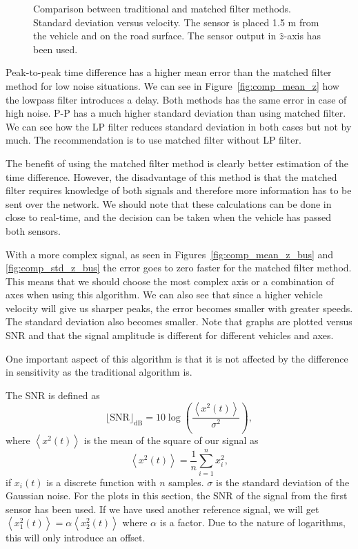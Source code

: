 \begin{subfigures}
\begin{figure}[!tbh]
\begin{minipage}{0.45\linewidth}
  \caption[Time difference, method comparison. Error standard deviation versus velocity]{Comparison between traditional and matched filter methods. Standard deviation versus velocity. The sensor is placed 1.5 m from the vehicle and on the road surface. The sensor output in $\hat{z}$-axis has been used.}
  \label{fig:comp_std-vel}
  \end{minipage}
 \end{figure}
\end{subfigures}

Peak-to-peak time difference has a higher mean error than the matched filter method for low noise situations. We can see in \mbox{Figure \ref{fig:comp_mean_z}} how the lowpass filter introduces a delay. Both methods has the same error in case of high noise. P-P has a much higher standard deviation than using matched filter. We can see how the LP filter reduces standard deviation in both cases but not by much. The recommendation is to use matched filter without LP filter.

The benefit of using the matched filter method is clearly better estimation of the time difference. However, the disadvantage of this method is that the matched filter requires knowledge of both signals and therefore more information has to be sent over the network. We should note that these calculations can be done in close to real-time, and the decision can be taken when the vehicle has passed both sensors.

With a more complex signal, as seen in Figures~\ref{fig:comp_mean_z_bus} and \ref{fig:comp_std_z_bus} the error goes to zero faster for the matched filter method. This means that we should choose the most complex axis or a combination of axes when using this algorithm. We can also see that since a higher vehicle velocity will give us sharper peaks, the error becomes smaller with greater speeds. The standard deviation also becomes smaller. Note that graphs are plotted versus SNR and that the signal amplitude is different for different vehicles and axes.

One important aspect of this algorithm is that it is not affected by the difference in sensitivity as the traditional algorithm is.

The SNR is defined as
\begin{equation}
 \lfloor{}\text{SNR}\rfloor_{\text{dB}} = 10 \log{\left(\frac{\left\langle{}x^2(t)\right\rangle}{\sigma^2}\right)},
\end{equation}
where $\left\langle{}x^2(t)\right\rangle$ is the mean of the square of our signal as
\begin{equation}
  \left\langle{}x^2(t)\right\rangle = \frac{1}{n} \sum_{i=1}^{n} x_i^2,
\end{equation}
 if $x_i(t)$ is a discrete function with $n$ samples. $\sigma$ is the standard deviation of the Gaussian noise. For the plots in this section, the SNR of the signal from the first sensor has been used. If we have used another reference signal, we will get $\left\langle{}x_1^2(t)\right\rangle = \alpha\left\langle{}x_2^2(t)\right\rangle$ where $\alpha$ is a factor. Due to the nature of logarithms, this will only introduce an offset.

